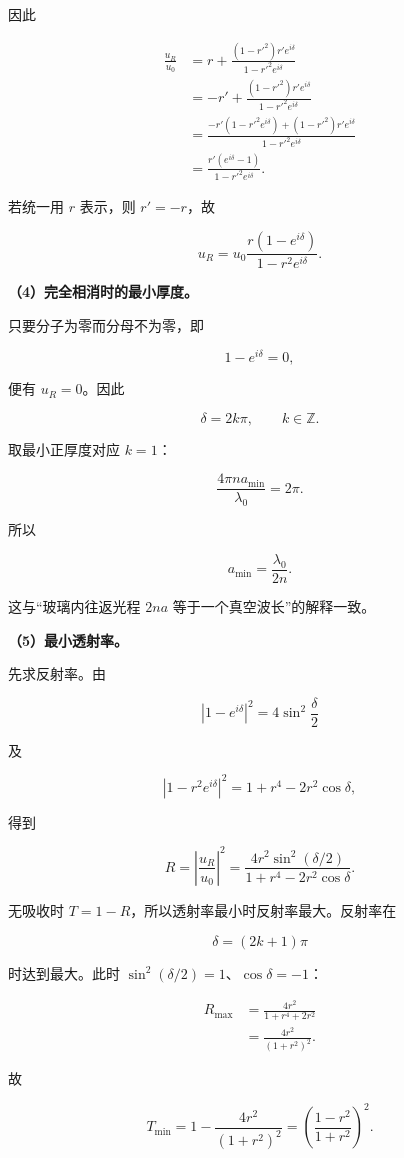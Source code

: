\documentclass[12pt,a4paper,UTF8]{ctexart}
\begin{document}
因此

\[
\begin{aligned}
\frac{u_R}{u_0}
&=r+\frac{(1-r'^2)r'e^{i\delta}}{1-r'^2e^{i\delta}}\\
&=-r'+\frac{(1-r'^2)r'e^{i\delta}}{1-r'^2e^{i\delta}}\\
&=\frac{-r'(1-r'^2e^{i\delta})+(1-r'^2)r'e^{i\delta}}
{1-r'^2e^{i\delta}}\\
&=\frac{r'(e^{i\delta}-1)}{1-r'^2e^{i\delta}}.
\end{aligned}
\]

若统一用 \(r\) 表示，则 \(r'=-r\)，故

\[
\boxed{u_R=u_0\frac{r(1-e^{i\delta})}{1-r^2e^{i\delta}}}.
\]

\textbf{（4）完全相消时的最小厚度。}

只要分子为零而分母不为零，即

\[1-e^{i\delta}=0,\]

便有 \(u_R=0\)。因此

\[\delta=2k\pi,\qquad k\in\mathbb Z.\]

取最小正厚度对应 \(k=1\)：

\[\frac{4\pi na_{\min}}{\lambda_0}=2\pi.\]

所以

\[\boxed{a_{\min}=\frac{\lambda_0}{2n}}.\]

这与``玻璃内往返光程 \(2na\) 等于一个真空波长''的解释一致。

\textbf{（5）最小透射率。}

先求反射率。由

\[|1-e^{i\delta}|^2=4\sin^2\frac\delta2\]

及

\[|1-r^2e^{i\delta}|^2=1+r^4-2r^2\cos\delta,\]

得到

\[
R=\left|\frac{u_R}{u_0}\right|^2
=\frac{4r^2\sin^2(\delta/2)}{1+r^4-2r^2\cos\delta}.
\]

无吸收时 \(T=1-R\)，所以透射率最小时反射率最大。反射率在

\[\delta=(2k+1)\pi\]

时达到最大。此时 \(\sin^2(\delta/2)=1\)、\(\cos\delta=-1\)：

\[
\begin{aligned}
R_{\max}
&=\frac{4r^2}{1+r^4+2r^2}\\
&=\frac{4r^2}{(1+r^2)^2}.
\end{aligned}
\]

故

\[
\boxed{T_{\min}=1-\frac{4r^2}{(1+r^2)^2}
=\left(\frac{1-r^2}{1+r^2}\right)^2}.
\]
\end{document}

